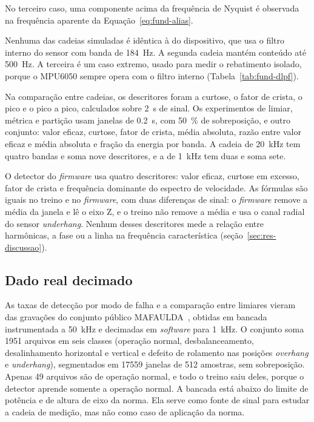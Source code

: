 No terceiro caso, uma componente acima da frequência de Nyquist é observada na frequência
aparente da Equação~\eqref{eq:fund-alias}.

Nenhuma das cadeias simuladas é idêntica à do dispositivo, que usa o filtro interno do
sensor com banda de \SI{184}{\hertz}. A segunda cadeia mantém conteúdo até
\SI{500}{\hertz}. A terceira é um caso extremo, usado para medir o rebatimento isolado,
porque o MPU6050 sempre opera com o filtro interno (Tabela~\ref{tab:fund-dlpf}).

Na comparação entre cadeias, os descritores foram a curtose, o fator de crista, o pico e o pico
a pico, calculados sobre \SI{2}{\second} de sinal. Os experimentos de limiar, métrica e partição
usam janelas de \SI{0,2}{\second}, com \SI{50}{\percent} de sobreposição, e outro conjunto: valor
eficaz, curtose, fator de crista, média absoluta, razão entre valor eficaz e média absoluta e fração
da energia por banda. A cadeia de \SI{20}{\kilo\hertz} tem quatro bandas e soma nove descritores, e
a de \SI{1}{\kilo\hertz} tem duas e soma sete.

O detector do \emph{firmware} usa quatro descritores: valor eficaz, curtose em excesso, fator de
crista e frequência dominante do espectro de velocidade. As fórmulas são iguais no treino e no
\emph{firmware}, com duas diferenças de sinal: o \emph{firmware} remove a média da janela e lê o eixo
Z, e o treino não remove a média e usa o canal radial do sensor \emph{underhang}. Nenhum desses
descritores mede a relação entre harmônicas, a fase ou a linha na frequência característica
(seção~\ref{sec:res-discussao}).

\subsection{Dado real decimado}

As taxas de detecção por modo de falha e a comparação entre limiares vieram das gravações do conjunto público
MAFAULDA~\cite{mafaulda}, obtidas em bancada instrumentada a \SI{50}{\kilo\hertz} e
decimadas em \emph{software} para \SI{1}{\kilo\hertz}. O conjunto soma \num{1951} arquivos
em seis classes (operação normal, desbalanceamento, desalinhamento horizontal e vertical e
defeito de rolamento nas posições \emph{overhang} e \emph{underhang}), segmentados em
\num{17559} janelas de \num{512} amostras, sem sobreposição. Apenas \num{49} arquivos são de operação normal,
e todo o treino saiu deles, porque o detector aprende somente a operação normal. A bancada
está abaixo do limite de potência e de altura de eixo da norma. Ela serve como fonte de
sinal para estudar a cadeia de medição, mas não como caso de aplicação da norma.

